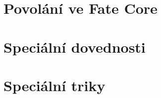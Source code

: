 \documentclass[../main.tex]{subfiles}
\begin{document}
\section{Povolání ve Fate Core}
\label{sec:povolani-fate-core}

\section{Speciální dovednosti}
\label{sec:specialni-dovednosti}

\section{Speciální triky}
\label{sec:specialni-triky}
\end{document}
